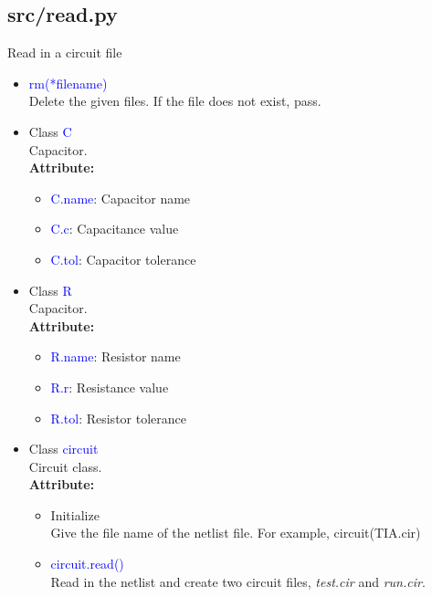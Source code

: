 \documentclass[12pt,a4paper]{article}
\begin{document}
\subsection{src/read.py}
Read in a circuit file

\begin{itemize}[leftmargin=*]
    \item \textcolor{blue}{rm(*filename)}\\
        Delete the given files. If the file does not exist, pass.

    \item Class \textcolor{blue}{C}\\
        Capacitor.\\
        \textbf{Attribute:}
        \begin{itemize}
            \item \textcolor{blue}{C.name}: Capacitor name
            \item \textcolor{blue}{C.c}: Capacitance value
            \item \textcolor{blue}{C.tol}: Capacitor tolerance
        \end{itemize}

    \item Class \textcolor{blue}{R}\\
        Capacitor.\\
        \textbf{Attribute:}
        \begin{itemize}
            \item \textcolor{blue}{R.name}: Resistor name
            \item \textcolor{blue}{R.r}: Resistance value
            \item \textcolor{blue}{R.tol}: Resistor tolerance
        \end{itemize}

    \item Class \textcolor{blue}{circuit}\\
        Circuit class.\\
        \textbf{Attribute:}
        \begin{itemize}
            \item Initialize\\
                Give the file name of the netlist file. For example, circuit(TIA.cir)

            \item \textcolor{blue}{circuit.read()}\\
                Read in the netlist and create two circuit files, \textit{test.cir} and \textit{run.cir}.


\end{itemize}
\end{itemize}
\end{document}
